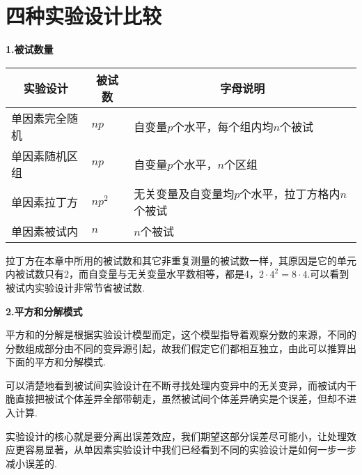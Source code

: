 \section{四种实验设计比较}
\textbf{1.被试数量}

\begin{table*}[h!]
    \renewcommand\arraystretch{1.25}
    \begin{tabular}{lll}
        \toprule
        \multicolumn{1}{c}{实验设计}          &    \multicolumn{1}{c}{被试数}        &    \multicolumn{1}{c}{字母说明}\\
        \midrule
        单因素完全随机    &    $np$          &     自变量$p$个水平，每个组内均$n$个被试 \\
        单因素随机区组    &    $np$          &     自变量$p$个水平，$n$个区组\\
        单因素拉丁方      &    $np^2$  &     无关变量及自变量均$p$个水平，拉丁方格内$n$个被试\\
        单因素被试内      &    $n$           &     $n$个被试\\
        \bottomrule
    \end{tabular}
\end{table*}
拉丁方在本章中所用的被试数和其它非重复测量的被试数一样，其原因是它的单元内被试数只有2，而自变量与无关变量水平数相等，都是4，$2\cdot 4^2 = 8 \cdot 4$.可以看到被试内实验设计非常节省被试数.

\textbf{2.平方和分解模式}

平方和的分解是根据实验设计模型而定，这个模型指导着观察分数的来源，不同的分数组成部分由不同的变异源引起，故我们假定它们都相互独立，由此可以推算出下面的平方和分解模式.

可以清楚地看到被试间实验设计在不断寻找处理内变异中的无关变异，而被试内干脆直接把被试个体差异全部带朝走，虽然被试间个体差异确实是个误差，但却不进入计算.

实验设计的核心就是要分离出误差效应，我们期望这部分误差尽可能小，让处理效应更容易显著，从单因素实验设计中我们已经看到不同的实验设计是如何一步一步减小误差的.


